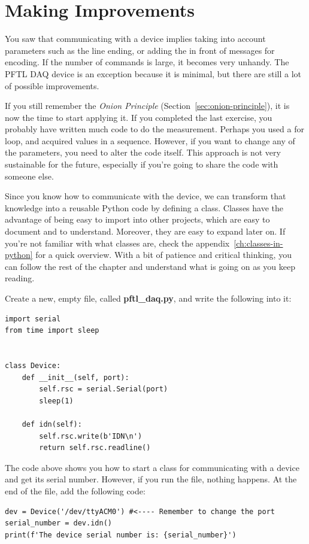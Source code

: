 \section{Making Improvements}\label{sec:going-higher-level}
You saw that communicating with a device implies taking into account parameters such as the line ending, or adding the  in front of messages for encoding. If the number of commands is large, it becomes very unhandy. The {PFTL DAQ} device is an exception because it is minimal, but there are still a lot of possible improvements.

If you still remember the \emph{Onion Principle} (Section~\ref{sec:onion-principle}), it is now the time to start applying it. If you completed the last exercise, you probably have written much code to do the measurement. Perhaps you used a for loop, and acquired values in a sequence. However, if you want to change any of the parameters, you need to alter the code itself. This approach is not very sustainable for the future, especially if you're going to share the code with someone else.

Since you know how to communicate with the device, we can transform that knowledge into a reusable Python code by defining a class. Classes have the advantage of being easy to import into other projects, which are easy to document and to understand. Moreover, they are easy to expand later on. If you're not familiar with what classes are, check the appendix~\ref{ch:classes-in-python} for a quick overview. With a bit of patience and critical thinking, you can follow the rest of the chapter and understand what is going on as you keep reading.

Create a new, empty file, called \textbf{pftl\_daq.py}, and write the following into it:

\begin{verbatim}
import serial
from time import sleep


class Device:
    def __init__(self, port):
        self.rsc = serial.Serial(port)
        sleep(1)

    def idn(self):
        self.rsc.write(b'IDN\n')
        return self.rsc.readline()

\end{verbatim}

The code above shows you how to start a class for communicating with a device and get its serial number. However, if you run the file, nothing happens. At the end of the file, add the following code:

\begin{verbatim}
dev = Device('/dev/ttyACM0') #<---- Remember to change the port
serial_number = dev.idn()
print(f'The device serial number is: {serial_number}')
\end{verbatim}

